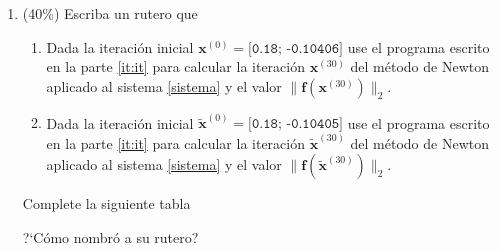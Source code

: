 \begin{enumerate}
\medskip
\noindent ?`C\'omo nombr\'o a su funci\'on?\newline
{}

\bigskip

\item\label{it:initial_guesses} (40\%) Escriba un rutero \matlab que
\begin{enumerate}
\item Dada la iteraci\'on inicial $\boldsymbol{x}^{(0)} = \texttt{[0.18; -0.10406]}$ use el programa escrito en la parte \ref{it:it} para calcular la iteraci\'on $\boldsymbol{x}^{(30)}$ del m\'etodo de Newton aplicado al sistema \eqref{sistema} y el valor $\| \boldsymbol{f}(\boldsymbol{x}^{(30)}) \|_2$.
\item Dada la iteraci\'on inicial $\boldsymbol{\tilde x}^{(0)} = \texttt{[0.18; -0.10405]}$ use el programa escrito en la parte \ref{it:it} para calcular la iteraci\'on $\boldsymbol{\tilde x}^{(30)}$ del m\'etodo de Newton aplicado al sistema \eqref{sistema} y el valor $\| \boldsymbol{f}(\boldsymbol{\tilde x}^{(30)}) \|_2$.
\end{enumerate}
%

\medskip
\noindent Complete la siguiente tabla\newline
{}

\medskip
\noindent ?`C\'omo nombr\'o a su rutero?\newline
{}

\end{enumerate}

